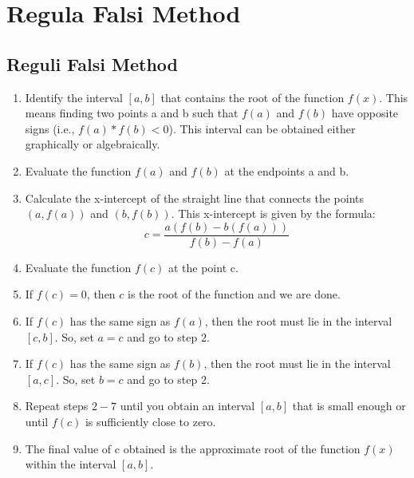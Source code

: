 \newpage
\chapter{Regula Falsi Method}



\section{Reguli Falsi Method}

\begin{enumerate}
  \item Identify the interval $[a,b]$ that contains the root of the function $f(x)$. This means finding two points a and b such that $f(a)$ and $f(b)$ have opposite signs (i.e., $f(a) * f(b) < 0$). This interval can be obtained either graphically or algebraically.

  \item Evaluate the function $f(a)$ and $f(b)$ at the endpoints a and b.
  
  \item Calculate the x-intercept of the straight line that connects the points $(a, f(a))$ and $(b, f(b))$. This x-intercept is given by the formula:
  \begin{equation*}
    c = \frac{a(f(b) - b(f(a)))}{f(b) - f(a)}
  \end{equation*}
  
  \item Evaluate the function $f(c)$ at the point c.
  
  \item If $f(c) = 0$, then $c$ is the root of the function and we are done.
  
  \item If $f(c)$ has the same sign as $f(a)$, then the root must lie in the interval $[c,b]$. So, set $a = c$ and go to step 2.
  
  \item If $f(c)$ has the same sign as $f(b)$, then the root must lie in the interval $[a,c]$. So, set $b = c$ and go to step 2.
  
  \item Repeat steps $2-7$ until you obtain an interval $[a,b]$ that is small enough or until $f(c)$ is sufficiently close to zero.
  
  \item The final value of c obtained is the approximate root of the function $f(x)$ within the interval $[a,b]$.
  


\end{enumerate}

